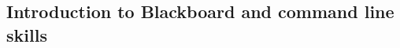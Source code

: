
\renewcommand{\tilde}{\textasciitilde}
\newcommand{\moodle}{Moodle}
\newcommand{\Moodle}{Moodle}

\begin{firstonly}
\chapter[Blackboard Intro and command line skills]{Introduction to Blackboard and command line skills}

\minitoc

  
\end{firstonly}


%
%
%
%
%
%


